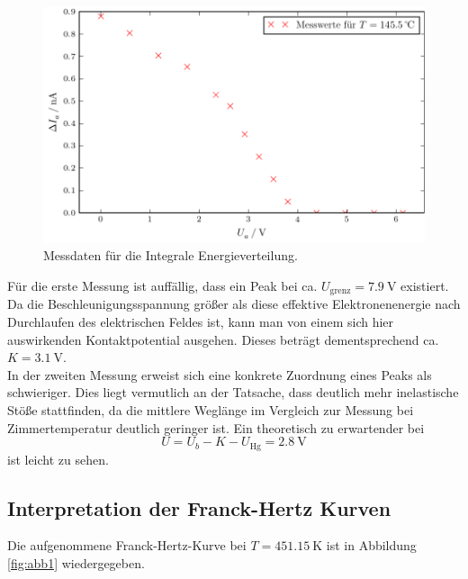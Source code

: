 \begin{figure}[H]
  \centering
  \includegraphics{build/aufgabenteil_a_plot_2.pdf}
  \caption{Messdaten für die Integrale Energieverteilung.}
  \label{fig:plot2}
\end{figure}

Für die erste Messung ist auffällig, dass ein Peak bei ca. $U_{\text{grenz}} = \SI{7.9}{\volt}$ existiert.
Da die Beschleunigungsspannung größer als diese effektive Elektronenenergie nach Durchlaufen des elektrischen Feldes ist, kann man von einem sich hier auswirkenden Kontaktpotential ausgehen.
Dieses beträgt dementsprechend ca. $K = \SI{3.1}{\volt}$.\\
In der zweiten Messung erweist sich eine konkrete Zuordnung eines Peaks als schwieriger.
Dies liegt vermutlich an der Tatsache, dass deutlich mehr inelastische Stöße stattfinden, da die mittlere Weglänge im Vergleich zur Messung bei Zimmertemperatur deutlich geringer ist.
Ein theoretisch zu erwartender bei
\begin{equation}
  U = U_b - K - U_{\text{Hg}} = \SI{2.8}{\volt}
\end{equation}
ist leicht zu sehen.  %

\subsection{Interpretation der Franck-Hertz Kurven}
Die aufgenommene Franck-Hertz-Kurve bei $T = \SI{451.15}{\kelvin}$ ist in Abbildung \ref{fig:abb1} wiedergegeben.

